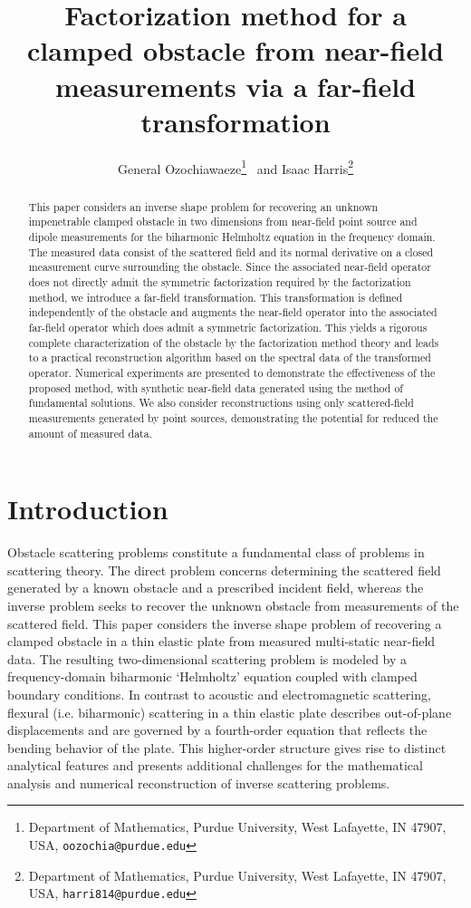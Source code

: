 \documentclass{article}
\begin{document}
\title{Factorization method for a clamped obstacle from near-field measurements via a far-field transformation}
\author{General Ozochiawaeze\footnote{Department of Mathematics, Purdue University, West Lafayette, IN 47907, USA, \texttt{oozochia@purdue.edu}} \, and Isaac Harris\footnote{Department of Mathematics, Purdue University, West Lafayette, IN 47907, USA, \texttt{harri814@purdue.edu}}}
\date{}
\maketitle
\begin{abstract}
This paper considers an inverse shape problem for recovering an unknown
impenetrable clamped obstacle in two dimensions from near-field point
source and dipole measurements for the biharmonic Helmholtz equation in
the frequency domain. The measured data consist of the scattered field
and its normal derivative on a closed measurement curve surrounding the
obstacle. Since the associated near-field operator does not directly admit the symmetric factorization required by the factorization method, we introduce a far-field transformation. This transformation is defined independently of the obstacle and augments the near-field operator into the associated far-field operator which does admit a symmetric factorization. This yields a rigorous complete characterization of the obstacle by the factorization method theory and leads to a practical reconstruction algorithm based on the spectral data of the transformed operator. Numerical experiments are presented to demonstrate
the effectiveness of the proposed method, with synthetic near-field data
generated using the method of fundamental solutions. We also consider reconstructions using only scattered-field measurements generated by point sources, demonstrating the potential for reduced the amount of measured data.
\end{abstract}


\section{Introduction}
Obstacle scattering problems constitute a fundamental class of problems in scattering theory. The direct problem concerns determining the scattered field generated by a known obstacle and a prescribed incident field, whereas the inverse problem seeks to recover the unknown obstacle from measurements of the scattered field. This paper considers the inverse shape problem of recovering a clamped obstacle in a thin elastic plate from measured multi-static near-field data. The resulting two-dimensional scattering problem is modeled by a frequency-domain biharmonic `Helmholtz' equation coupled with clamped boundary conditions. In contrast to acoustic and electromagnetic scattering, flexural (i.e. biharmonic)  scattering in a thin elastic plate describes out-of-plane displacements and are governed by a fourth-order equation that reflects the bending behavior of the plate. This higher-order structure gives rise to distinct analytical features and presents additional challenges for the mathematical analysis and numerical reconstruction of inverse scattering problems.
\end{document}
